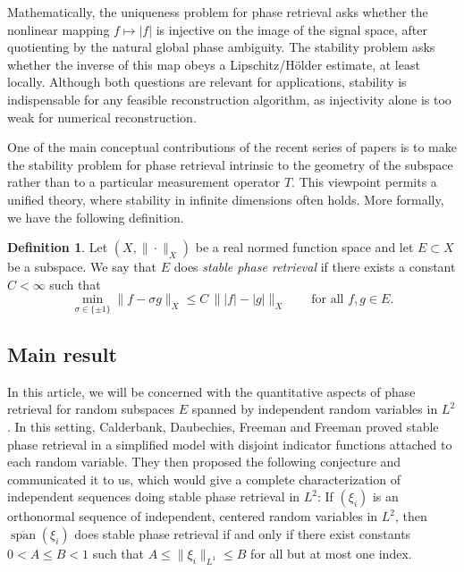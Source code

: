 \documentclass[11pt]{amsart}
\numberwithin{equation}{section}
\theoremstyle{definition}
\newtheorem{definition}[theorem]{Definition}
\theoremstyle{remark}
\newcommand{\Span}{\operatorname{span}}
\newcommand{\abs}[1]{\lvert #1 \rvert}
\newcommand{\norm}[1]{\lVert #1 \rVert}
\begin{document}
Mathematically, the uniqueness problem for phase retrieval asks whether the nonlinear mapping $f\mapsto |f|$ is injective on the image of the signal space, after quotienting by the natural global phase ambiguity. The stability problem asks whether the inverse of this map obeys a Lipschitz/H\"older  estimate, at least locally. Although both questions are relevant for applications, stability is indispensable for any feasible reconstruction algorithm, as injectivity alone is
too weak for numerical reconstruction.

One of the main conceptual contributions of the recent series of papers
\cite{calderbank2022stable,camunez2025characterization,christ2022examples,FOTP,garcia2025isometric,garcia2025existence} is to make the stability problem for phase retrieval intrinsic to the geometry of the
subspace rather than to a particular measurement operator $T$. This viewpoint permits a unified theory, where stability in infinite dimensions often holds.   More formally, we have the following definition.
\begin{definition}\label{DefinitionSPR}
    Let $(X,\|\cdot\|_X)$ be a real normed function space and let
$E\subset X$ be a subspace.  We say that $E$ does \emph{stable phase
retrieval} if there exists a constant $C<\infty$ such that
\begin{equation*}
\label{def:stable_pr}
\min_{\sigma\in\{\pm1\}}\norm{f-\sigma g}_X
\le C\,\norm{\abs{f}-\abs{g}}_X
\qquad\text{for all }f,g\in E.
\end{equation*}
\end{definition}

 
\subsection{Main result} In this article, we will be concerned with the quantitative aspects of phase retrieval for random subspaces $E$ spanned
by independent random variables in $L^2$. %
In this setting, Calderbank, Daubechies, Freeman and Freeman
\cite{calderbank2022stable} proved stable phase retrieval in a simplified model with disjoint indicator functions attached to each random variable. They  then proposed the following conjecture and communicated it to us, which would give a complete characterization of independent sequences doing stable phase retrieval in $L^2$: If $(\xi_i)$ is an orthonormal sequence of independent, centered
random variables in $L^2$, then $\overline{\Span}(\xi_i)$ does stable phase retrieval if and only if there exist constants $0<A\le B<1$ such that $A\le \norm{\xi_i}_{L^1}\le B$ for all but at most one index. 
\end{document}
